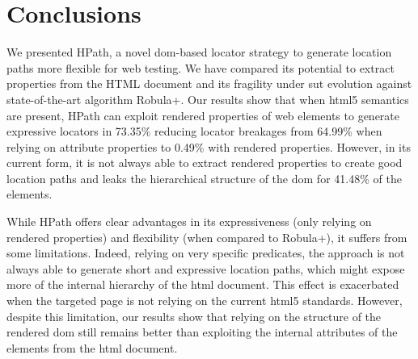 \section{Conclusions}

We presented HPath, a novel \gls{dom}-based locator strategy to generate location paths more flexible for web testing. We have compared its potential to extract properties from the HTML document and its fragility under \gls{sut} evolution against state-of-the-art algorithm Robula+. Our results show that when \gls{html}5 semantics are present, HPath can exploit rendered properties of web elements to generate expressive locators in 73.35\% reducing locator breakages from 64.99\% when relying on attribute properties to 0.49\% with rendered properties. However, in its current form, it is not always able to extract rendered properties to create good location paths and leaks the hierarchical structure of the \gls{dom} for 41.48\% of the elements.

While HPath offers clear advantages in its expressiveness (only relying on rendered properties) and flexibility (when compared to Robula+), it suffers from some limitations. Indeed, relying on very specific predicates, the approach is not always able to generate short and expressive location paths, which might expose more of the internal hierarchy of the \gls{html} document. This effect is exacerbated when the targeted page is not relying on the current \gls{html}5 standards. However, despite this limitation, our results show that relying on the structure of the rendered \gls{dom} still remains better than exploiting the internal attributes of the elements from the \gls{html} document.